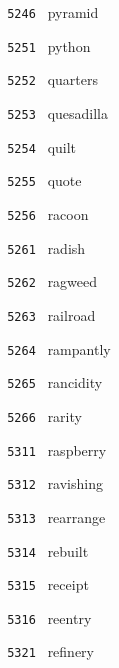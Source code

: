 \documentclass[11pt]{article}
\begin{document}
\begin{multicols}{6}
\noindent \texttt{ 5246 } \hspace{1mm} pyramid  \par
\noindent \texttt{ 5251 } \hspace{1mm} python  \par
\noindent \texttt{ 5252 } \hspace{1mm} quarters  \par
\noindent \texttt{ 5253 } \hspace{1mm} quesadilla  \par
\noindent \texttt{ 5254 } \hspace{1mm} quilt  \par
\noindent \texttt{ 5255 } \hspace{1mm} quote  \par
\noindent \texttt{ 5256 } \hspace{1mm} racoon  \par
\noindent \texttt{ 5261 } \hspace{1mm} radish  \par
\noindent \texttt{ 5262 } \hspace{1mm} ragweed  \par
\noindent \texttt{ 5263 } \hspace{1mm} railroad  \par
\noindent \texttt{ 5264 } \hspace{1mm} rampantly  \par
\noindent \texttt{ 5265 } \hspace{1mm} rancidity  \par
\noindent \texttt{ 5266 } \hspace{1mm} rarity  \par
\noindent \texttt{ 5311 } \hspace{1mm} raspberry  \par
\noindent \texttt{ 5312 } \hspace{1mm} ravishing  \par
\noindent \texttt{ 5313 } \hspace{1mm} rearrange  \par
\noindent \texttt{ 5314 } \hspace{1mm} rebuilt  \par
\noindent \texttt{ 5315 } \hspace{1mm} receipt  \par
\noindent \texttt{ 5316 } \hspace{1mm} reentry  \par
\noindent \texttt{ 5321 } \hspace{1mm} refinery  \par

\end{multicols}
\end{document}
